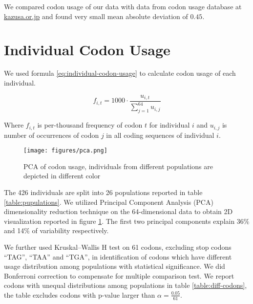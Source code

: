 \documentclass{article}
\begin{document}
We compared codon usage of our data with data from codon usage database at
\href{https://www.kazusa.or.jp/codon/cgi-bin/showcodon.cgi?species=9606}{kazusa.or.jp}
\cite{nakamura2000codon} and found very small mean absolute deviation of
$0.45$.

\section{Individual Codon Usage}

We used formula \ref{eq:individual-codon-usage} to calculate codon usage of
each individual.

\begin{equation}
  \label{eq:individual-codon-usage}
  f_{i, t} = 1000 \cdot \frac{u_{i, t}}{\sum_{j = 1}^{64} u_{i, j}}
\end{equation}

Where $f_{i, t}$ is per-thousand frequency of codon $t$ for individual $i$ and
$u_{i, j}$ is number of occurrences of codon $j$ in all coding sequences of
individual $i$.

\begin{figure}[h]
  \centering
  \texttt{[image: figures/pca.png]}
  \caption{PCA of codon usage, individuals from different populations are
    depicted in different color}
  \label{fig:pca}
\end{figure}

The 426 individuals are split into 26 populations reported in table
\ref{table:pupulations}. We utilized Principal Component Analysis
(PCA)\cite{pearson1901liii} dimensionality reduction technique on the
64-dimensional data to obtain 2D visualization reported in figure
\ref{fig:pca}. The first two principal components explain 36\% and 14\% of
variability respectively.

We further used Kruskal–Wallis H test\cite{kruskal1952use} on 61 codons,
excluding stop codons ``TAG'', ``TAA'' and ``TGA'', in identification of codons
which have different usage distribution among populations with statistical
significance. We did Bonferroni correction\cite{dunn1958estimation} to
compensate for multiple comparison test. We report codons with unequal
distributions among populations in table \ref{table:diff-codons}, the table
excludes codons with p-value larger than $\alpha = \frac{0.05}{61}$.
\end{document}
